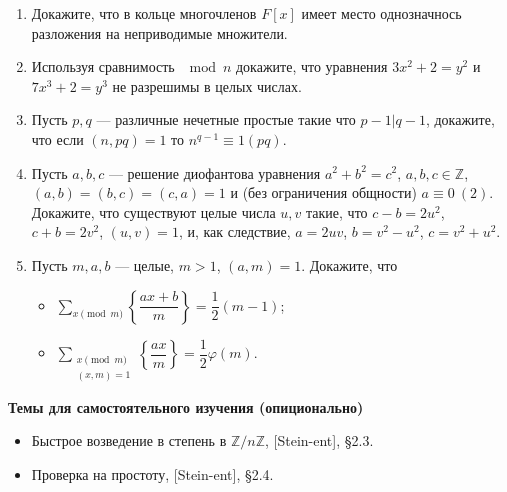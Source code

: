 \documentclass[a4paper, 11pt]{article}
\begin{document}
\begin{enumerate}[topsep=0pt]
    \item Докажите, что в кольце многочленов $F[x]$ имеет место однозначнось разложения на неприводимые множители.
    
    \item Используя сравнимость $\mod n$  докажите, что уравнения $3x^2+2=y^2$ и $7x^3+2=y^3$ не разрешимы в целых числах.
    \item Пусть $p,q$ --- различные нечетные простые такие что $p-1|q-1$, докажите, что если $(n,pq)=1$ то $n^{q-1} \equiv 1 (pq)$.
    \item Пусть $a,b,c$ --- решение диофантова уравнения $a^2+b^2=c^2$, $a,b,c \in \mathbb{Z}$, $(a,b)=(b,c)=(c,a)=1$ и (без ограничения общности) $a\equiv 0\ (2)$. Докажите, что существуют целые числа $u,v$ такие, что $c-b=2u^2$, $c+b=2v^2$, $(u,v)=1$, и, как следствие, $a=2uv$, $b=v^2-u^2$, $c=v^2+u^2$.
    \item Пусть $m,a,b$ --- целые, $m>1$, $(a,m)=1$. Докажите, что
    \begin{itemize}
        \item $\sum\limits_{x \pmod m} \left\{ \dfrac{ax+b}{m} \right\} = \dfrac{1}{2}(m-1)$;
        \item $\sum\limits_{\substack{x \pmod m\\(x,m)=1}} \left\{ \dfrac{ax}{m} \right\} = \dfrac{1}{2}\varphi(m)$.
    \end{itemize}
    
\end{enumerate}


    

\noindent\textbf{Темы для самостоятельного изучения (опиционально)}
\begin{itemize}[topsep=0pt]
    \item Быстрое возведение в степень в $\mathbb{Z}/n\mathbb{Z}$, [Stein-ent], \S 2.3.
    \item Проверка на простоту, [Stein-ent], \S 2.4.
\end{itemize}
\end{document}
